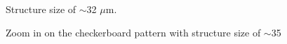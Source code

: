 \begin{figure}[H]
	\centering
	\caption{Structure size of $\sim$32 $\mu$m.}
	\label{fig:b2d4_q4}
\end{figure}
\begin{figure}[H]
	\centering
	\caption{Zoom in on the checkerboard pattern with structure size of $\sim$35}
	\label{fig:b2d5_q5}
\end{figure}
